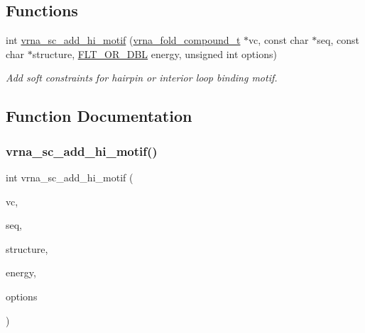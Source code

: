 \subsection*{Functions}
\begin{DoxyCompactItemize}
\item 
int \mbox{\hyperlink{group__constraints__ligand_gaa6ff0113a3a76dc0b8d62961f4e1dfa0}{vrna\+\_\+sc\+\_\+add\+\_\+hi\+\_\+motif}} (\mbox{\hyperlink{group__fold__compound_ga1b0cef17fd40466cef5968eaeeff6166}{vrna\+\_\+fold\+\_\+compound\+\_\+t}} $\ast$vc, const char $\ast$seq, const char $\ast$structure, \mbox{\hyperlink{group__data__structures_ga31125aeace516926bf7f251f759b6126}{F\+L\+T\+\_\+\+O\+R\+\_\+\+D\+BL}} energy, unsigned int options)
\begin{DoxyCompactList}\small\item\em Add soft constraints for hairpin or interior loop binding motif. \end{DoxyCompactList}\end{DoxyCompactItemize}


\subsection{Function Documentation}
\mbox{\label{group__constraints__ligand_gaa6ff0113a3a76dc0b8d62961f4e1dfa0}} 
\subsubsection{\texorpdfstring{vrna\+\_\+sc\+\_\+add\+\_\+hi\+\_\+motif()}{vrna\_sc\_add\_hi\_motif()}}
{\footnotesize\ttfamily int vrna\+\_\+sc\+\_\+add\+\_\+hi\+\_\+motif (\begin{DoxyParamCaption}\item[{\mbox{\hyperlink{group__fold__compound_ga1b0cef17fd40466cef5968eaeeff6166}{vrna\+\_\+fold\+\_\+compound\+\_\+t}} $\ast$}]{vc,  }\item[{const char $\ast$}]{seq,  }\item[{const char $\ast$}]{structure,  }\item[{\mbox{\hyperlink{group__data__structures_ga31125aeace516926bf7f251f759b6126}{F\+L\+T\+\_\+\+O\+R\+\_\+\+D\+BL}}}]{energy,  }\item[{unsigned int}]{options }\end{DoxyParamCaption})}



